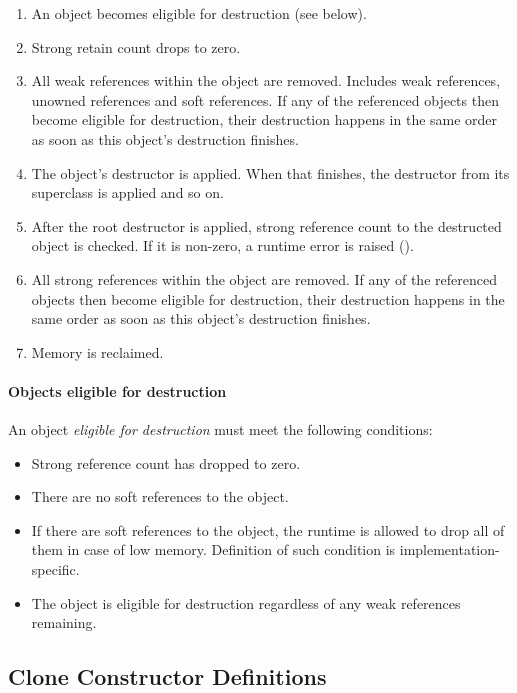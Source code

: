 \begin{enumerate}
  \item An object becomes eligible for destruction (see below). 
  \item Strong retain count drops to zero. 
  \item All weak references within the object are removed. Includes weak references, unowned references and soft references. If any of the referenced objects then become eligible for destruction, their destruction happens in the same order as soon as this object's destruction finishes. 
  \item The object's destructor is applied. When that finishes, the destructor from its superclass is applied and so on. 
  \item After the root destructor is applied, strong reference count to the destructed object is checked. If it is non-zero, a runtime error is raised ().
  \item All strong references within the object are removed. If any of the referenced objects then become eligible for destruction, their destruction happens in the same order as soon as this object's destruction finishes. 
  \item Memory is reclaimed. 
\end{enumerate}

\paragraph{Objects eligible for destruction}
An object {\em eligible for destruction} must meet the following conditions:
\begin{itemize}
  \item Strong reference count has dropped to zero. 
  \item There are no soft references to the object. 
  \item If there are soft references to the object, the runtime is allowed to drop all of them in case of low memory. Definition of such condition is implementation-specific. 
  \item The object is eligible for destruction regardless of any weak references remaining. 
\end{itemize}






\subsection{Clone Constructor Definitions}
\label{sec:clone-def}

